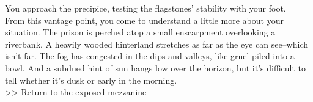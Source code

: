 You approach the precipice, testing the flagstones' stability with your foot.\\

From this vantage point, you come to understand a little more about your situation. The prison is perched atop a small enscarpment overlooking a riverbank. A heavily wooded hinterland stretches as far as the eye can see--which isn’t far. The fog has congested in the dips and valleys, like gruel piled into a bowl. And a subdued hint of sun hangs low over the horizon, but it's difficult to tell whether it's dusk or early in the morning.\\

>> Return to the exposed mezzanine -- 